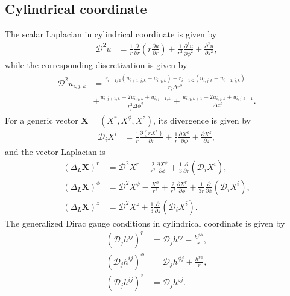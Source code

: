 \subsection{Cylindrical coordinate}
The scalar Laplacian in cylindrical coordinate is given by
\begin{align}
    \mathcal{D}^2 u &= \frac{1}{r}\frac{\partial }{\partial r} \left( r \frac{\partial u}{\partial r}\right)
            + \frac{1}{r^2} \frac{\partial^2 u}{\partial \phi^2} 
            + \frac{\partial^2 u}{\partial z^2},
\end{align}
while the corresponding discretization is given by
\begin{align}
\begin{split}
    \mathcal{D}^2 u_{i,j,k} &= \frac{ r_{i+1/2} \left(u_{i+1,j,k} - u_{i,j,k} \right)
            - r_{i-1/2} \left(u_{i,j,k} - u_{i-1,j,k} \right)}{r_i \Delta r^2} \\
            &+ \frac{ u_{i,j+1,k} - 2 u_{i,j,k} + u_{i,j-1,k}}{r_i^2 \Delta \phi^2}
            + \frac{ u_{i,j,k+1} - 2 u_{i,j,k} + u_{i,j,k-1}}{\Delta z^2}.
\end{split}
\end{align}
For a generic vector $\mathbf{X} = \left(X^r, X^\phi, X^z \right)$, its divergence is given by
\begin{align}
    \mathcal{D}_i X^i &= \frac{1}{r}\frac{\partial \left(r X^r\right)}{\partial r} + \frac{1}{r}\frac{\partial X^\phi}{\partial \phi}
            + \frac{\partial X^z}{\partial z},
\end{align}
and the vector Laplacian is
\begin{align}
    \left(\Delta_L \mathbf{X}\right)^r &= \mathcal{D}^2 X^r - \frac{2}{r^2}\frac{\partial X^\phi}{\partial \phi}
            + \frac{1}{3}\frac{\partial}{\partial r}\left( \mathcal{D}_i X^i \right), \\
    \left(\Delta_L \mathbf{X}\right)^\phi &= \mathcal{D}^2 X^\phi - \frac{X^\phi}{r^2} + \frac{2}{r^2}\frac{\partial X^r}{\partial \phi}
            + \frac{1}{3 r}\frac{\partial}{\partial \phi}\left( \mathcal{D}_i X^i \right), \\
    \left(\Delta_L \mathbf{X}\right)^z &= \mathcal{D}^2 X^z + \frac{1}{3}\frac{\partial}{\partial z}\left( \mathcal{D}_i X^i \right).
\end{align}
The generalized Dirac gauge conditions in cylindrical coordinate is given by
\begin{align}
    \left(\mathcal{D}_j h^{ij}\right)^r &= \mathcal{D}_j h^{rj} - \frac{h^{\phi\phi}}{r}, \\
    \left(\mathcal{D}_j h^{ij}\right)^\phi &= \mathcal{D}_j h^{\phi j} + \frac{h^{r\phi}}{r}, \\
    \left(\mathcal{D}_j h^{ij}\right)^z &= \mathcal{D}_j h^{z j}.
\end{align}

